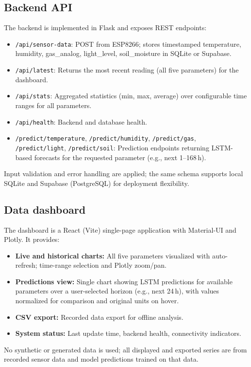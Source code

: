 \documentclass[journal,onecolumn]{IEEEtran}
\begin{document}
\subsection{Backend API}
The backend is implemented in Flask and exposes REST endpoints:
\begin{itemize}
    \item \texttt{/api/sensor-data}: POST from ESP8266; stores timestamped temperature, humidity, gas\_analog, light\_level, soil\_moisture in SQLite or Supabase.
    \item \texttt{/api/latest}: Returns the most recent reading (all five parameters) for the dashboard.
    \item \texttt{/api/stats}: Aggregated statistics (min, max, average) over configurable time ranges for all parameters.
    \item \texttt{/api/health}: Backend and database health.
    \item \texttt{/predict/temperature}, \texttt{/predict/humidity}, \texttt{/predict/gas}, \texttt{/predict/light}, \texttt{/predict/soil}: Prediction endpoints returning LSTM-based forecasts for the requested parameter (e.g., next 1--168\,h).
\end{itemize}
Input validation and error handling are applied; the same schema supports local SQLite and Supabase (PostgreSQL) for deployment flexibility.

\subsection{Data dashboard}
The dashboard is a React (Vite) single-page application with Material-UI and Plotly. It provides:
\begin{itemize}
    \item \textbf{Live and historical charts:} All five parameters visualized with auto-refresh; time-range selection and Plotly zoom/pan.
    \item \textbf{Predictions view:} Single chart showing LSTM predictions for available parameters over a user-selected horizon (e.g., next 24\,h), with values normalized for comparison and original units on hover.
    \item \textbf{CSV export:} Recorded data export for offline analysis.
    \item \textbf{System status:} Last update time, backend health, connectivity indicators.
\end{itemize}
No synthetic or generated data is used; all displayed and exported series are from recorded sensor data and model predictions trained on that data.
\end{document}
